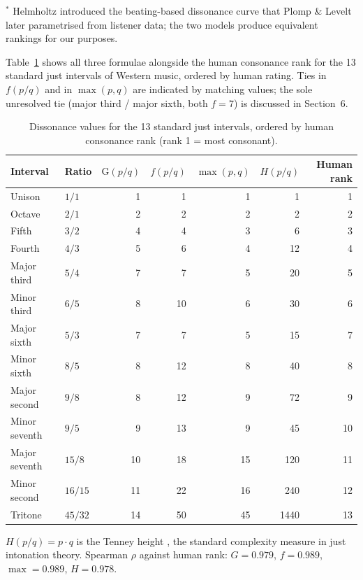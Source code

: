 \documentclass[11pt,a4paper]{article}
\newcommand{\G}{\mathrm{G}}
\begin{document}
\medskip
\noindent$^*$ Helmholtz \cite{helmholtz1863} introduced the beating-based
dissonance curve that Plomp \& Levelt \cite{plomplevelt1965} later parametrised
from listener data; the two models produce equivalent rankings for our
purposes.

\bigskip
\noindent Table~\ref{tab:intervals} shows all three formulae alongside the
human consonance rank for the 13 standard just intervals of Western music,
ordered by human rating. Ties in $f(p/q)$ and in $\max(p,q)$ are indicated
by matching values; the sole unresolved tie (major third / major sixth, both
$f = 7$) is discussed in Section~6.

\begin{table}[h]
\centering
\caption{Dissonance values for the 13 standard just intervals, ordered by
human consonance rank \cite{krumhansl1990} (rank 1 = most consonant).}
\label{tab:intervals}
\smallskip
\begin{tabular}{llrrrrr}
\toprule
Interval & Ratio & $\G(p/q)$ & $f(p/q)$ & $\max(p,q)$ & $H(p/q)$ & Human rank \\
\midrule
Unison        & $1/1$   &  1 &  1 &  1 &     1 &  1 \\
Octave        & $2/1$   &  2 &  2 &  2 &     2 &  2 \\
Fifth         & $3/2$   &  4 &  4 &  3 &     6 &  3 \\
Fourth        & $4/3$   &  5 &  6 &  4 &    12 &  4 \\
Major third   & $5/4$   &  7 &  7 &  5 &    20 &  5 \\
Minor third   & $6/5$   &  8 & 10 &  6 &    30 &  6 \\
Major sixth   & $5/3$   &  7 &  7 &  5 &    15 &  7 \\
Minor sixth   & $8/5$   &  8 & 12 &  8 &    40 &  8 \\
Major second  & $9/8$   &  8 & 12 &  9 &    72 &  9 \\
Minor seventh & $9/5$   &  9 & 13 &  9 &    45 & 10 \\
Major seventh & $15/8$  & 10 & 18 & 15 &   120 & 11 \\
Minor second  & $16/15$ & 11 & 22 & 16 &   240 & 12 \\
Tritone       & $45/32$ & 14 & 50 & 45 &  1440 & 13 \\
\bottomrule
\end{tabular}
\smallskip

\noindent\small $H(p/q) = p \cdot q$ is the Tenney height \cite{tenney1988},
the standard complexity measure in just intonation theory.
Spearman $\rho$ against human rank: $G = 0.979$, $f = 0.989$,
$\max = 0.989$, $H = 0.978$.
\end{table}
\end{document}
